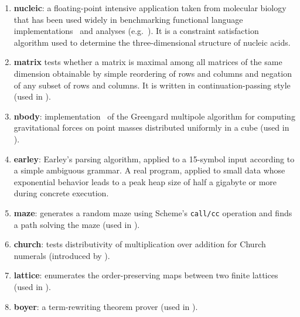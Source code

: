 \documentclass[9pt]{sigplanconf} %
\begin{document}
\begin{enumerate}  %

\item {\bf nucleic}: a floating-point intensive application taken from molecular biology that has been used widely in benchmarking functional language implementations~\cite{dvanhorn:Hartel1996Benchmarking} and analyses (e.g.~\cite{dvanhorn:wright-jagannathan-toplas98,dvanhorn:jagannathan-etal-popl98}).
%
  It is a constraint satisfaction algorithm used to determine the three-dimensional structure of nucleic acids.

\item {\bf matrix} tests whether a matrix is maximal among all matrices of the same dimension obtainable by simple reordering of rows and columns and negation of any subset of rows and columns.
%
  It is written in continuation-passing style (used in \cite{dvanhorn:wright-jagannathan-toplas98,dvanhorn:jagannathan-etal-popl98}).


\item {\bf nbody}: implementation~\cite{ianjohnson:nbody87} of the Greengard multipole algorithm for computing gravitational forces on point masses distributed uniformly in a cube (used in \cite{dvanhorn:wright-jagannathan-toplas98,dvanhorn:jagannathan-etal-popl98}).

\item {\bf earley}: Earley's parsing algorithm, applied to a 15-symbol input according to a simple ambiguous grammar.
%
  A real program, applied to small data whose exponential behavior leads to a peak heap size of half a gigabyte or more during concrete execution.

\item {\bf maze}: generates a random maze using Scheme's {\tt call/cc} operation and finds a path solving the maze (used in \cite{dvanhorn:wright-jagannathan-toplas98,dvanhorn:jagannathan-etal-popl98}).

\item {\bf church}: tests distributivity of multiplication over addition for Church numerals (introduced by \cite{dvanhorn:Vardoulakis2011CFA2}).

\item {\bf lattice}: enumerates the order-preserving maps between two finite lattices (used in \cite{dvanhorn:wright-jagannathan-toplas98,dvanhorn:jagannathan-etal-popl98}).

\item {\bf boyer}: a term-rewriting theorem prover (used in \cite{dvanhorn:wright-jagannathan-toplas98,dvanhorn:jagannathan-etal-popl98}).


\end{enumerate}
\end{document}
